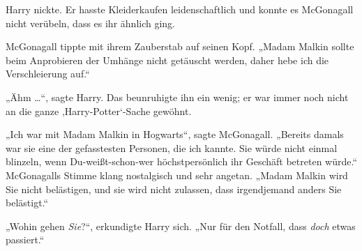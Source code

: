 Harry nickte. Er hasste Kleiderkaufen leidenschaftlich und konnte es McGonagall nicht verübeln, dass es ihr ähnlich ging.

McGonagall tippte mit ihrem Zauberstab auf seinen Kopf.
„Madam Malkin sollte beim Anprobieren der Umhänge nicht getäuscht werden, daher hebe ich die Verschleierung auf.“

„Ähm …“, sagte Harry. Das beunruhigte ihn ein wenig; er war immer noch nicht an die ganze ‚Harry-Potter‘-Sache gewöhnt.

„Ich war mit Madam Malkin in Hogwarts“, sagte McGonagall.
„Bereits damals war sie eine der gefasstesten Personen, die ich kannte. Sie würde nicht einmal blinzeln, wenn Du-weißt-schon-wer höchstpersönlich ihr Geschäft betreten würde.“ McGonagalls Stimme klang nostalgisch und sehr angetan.
„Madam Malkin wird Sie nicht belästigen, und sie wird nicht zulassen, dass irgendjemand anders Sie belästigt.“

„Wohin gehen \emph{Sie}?“, erkundigte Harry sich.
„Nur für den Notfall, dass \emph{doch} etwas passiert.“

